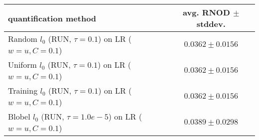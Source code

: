 \begin{tabular}{lc}
  \toprule
  quantification method & avg. RNOD $\pm$ stddev. \\
  \midrule
  Random $l_0$ (RUN, $\tau=0.1$) on LR ($w=u, C=0.1$) & $\mathbf{0.0362 \pm 0.0156}$ \\
  Uniform $l_0$ (RUN, $\tau=0.1$) on LR ($w=u, C=0.1$) & $\mathbf{0.0362 \pm 0.0156}$ \\
  Training $l_0$ (RUN, $\tau=0.1$) on LR ($w=u, C=0.1$) & $\mathbf{0.0362 \pm 0.0156}$ \\
  Blobel $l_0$ (RUN, $\tau=1.0e-5$) on LR ($w=u, C=0.1$) & $0.0389 \pm 0.0298$ \\
  \bottomrule
\end{tabular}
